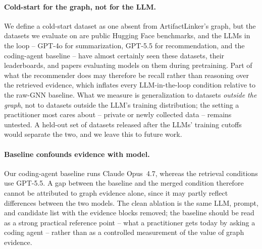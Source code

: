 \paragraph{Cold-start for the graph, not for the LLM.} We define a cold-start dataset as one absent from ArtifactLinker's graph, but the datasets we evaluate on are public Hugging Face benchmarks, and the LLMs in the loop -- GPT-4o for summarization, GPT-5.5 for recommendation, and the coding-agent baseline -- have almost certainly seen these datasets, their leaderboards, and papers evaluating models on them during pretraining. Part of what the recommender does may therefore be recall rather than reasoning over the retrieved evidence, which inflates every LLM-in-the-loop condition relative to the raw-GNN baseline. What we measure is generalization to datasets \emph{outside the graph}, not to datasets outside the LLM's training distribution; the setting a practitioner most cares about -- private or newly collected data -- remains untested. A held-out set of datasets released after the LLMs' training cutoffs would separate the two, and we leave this to future work.

\paragraph{Baseline confounds evidence with model.} Our coding-agent baseline runs Claude Opus~4.7, whereas the retrieval conditions use GPT-5.5. A gap between the baseline and the merged condition therefore cannot be attributed to graph evidence alone, since it may partly reflect differences between the two models. The clean ablation is the same LLM, prompt, and candidate list with the evidence blocks removed; the baseline should be read as a strong practical reference point -- what a practitioner gets today by asking a coding agent -- rather than as a controlled measurement of the value of graph evidence.
